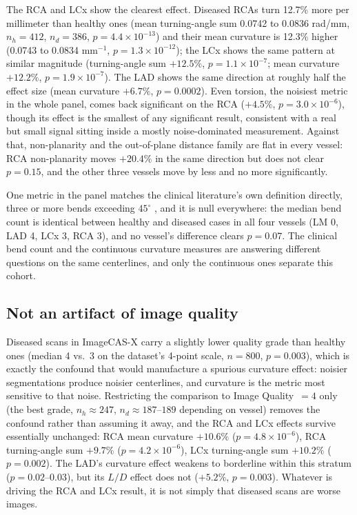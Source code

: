 The RCA and LCx show the clearest effect. Diseased RCAs turn 12.7\% more per millimeter than
healthy ones (mean turning-angle sum 0.0742 to 0.0836 rad/mm, $n_h=412$, $n_d=386$,
$p=4.4\times10^{-13}$) and their mean curvature is 12.3\% higher (0.0743 to 0.0834 mm$^{-1}$,
$p=1.3\times10^{-12}$); the LCx shows the same pattern at similar magnitude (turning-angle sum
$+12.5\%$, $p=1.1\times10^{-7}$; mean curvature $+12.2\%$, $p=1.9\times10^{-7}$). The LAD shows the
same direction at roughly half the effect size (mean curvature $+6.7\%$, $p=0.0002$). Even torsion,
the noisiest metric in the whole panel, comes back significant on the RCA ($+4.5\%$,
$p=3.0\times10^{-6}$), though its effect is the smallest of any significant result, consistent with
a real but small signal sitting inside a mostly noise-dominated measurement. Against that,
non-planarity and the out-of-plane distance family are flat in every vessel: RCA non-planarity
moves $+20.4\%$ in the same direction but does not clear $p=0.15$, and the other three vessels move
by less and no more significantly.

One metric in the panel matches the clinical literature's own definition directly,
three or more bends exceeding $45^\circ$ \cite{li2011tortuosity, zebicmihic2023tortuosity}, and it
is null everywhere: the median bend count is identical between healthy and diseased cases in all
four vessels (LM 0, LAD 4, LCx 3, RCA 3), and no vessel's difference clears $p=0.07$. The clinical
bend count and the continuous curvature measures are answering different questions on the same
centerlines, and only the continuous ones separate this cohort.

\subsection*{Not an artifact of image quality}

Diseased scans in ImageCAS-X carry a slightly lower quality grade than healthy ones (median 4 vs.\
3 on the dataset's 4-point scale, $n=800$, $p=0.003$), which is exactly the confound that would
manufacture a spurious curvature effect: noisier segmentations produce noisier centerlines, and
curvature is the metric most sensitive to that noise. Restricting the comparison to
Image Quality~$=4$ only (the best grade, $n_h\approx247$, $n_d\approx187$--$189$ depending on
vessel) removes the confound rather than assuming it away, and the RCA and LCx effects survive
essentially unchanged: RCA mean curvature $+10.6\%$ ($p=4.8\times10^{-6}$), RCA turning-angle sum
$+9.7\%$ ($p=4.2\times10^{-6}$), LCx turning-angle sum $+10.2\%$ ($p=0.002$). The LAD's curvature
effect weakens to borderline within this stratum ($p=0.02$--$0.03$), but its $L/D$ effect does not
($+5.2\%$, $p=0.003$). Whatever is driving the RCA and LCx result, it is not simply that diseased
scans are worse images.

